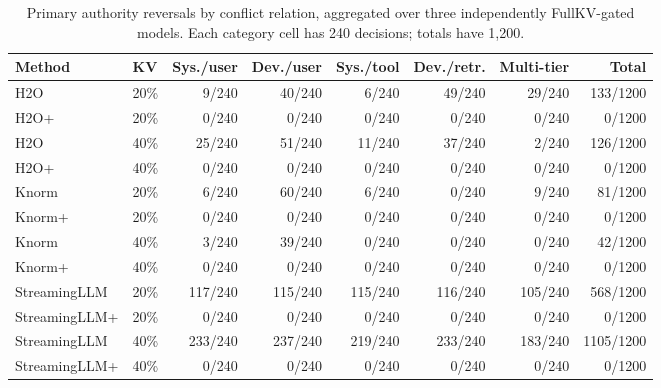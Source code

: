 \begin{table}[t]
\centering
\scriptsize
\setlength{\tabcolsep}{3.0pt}
\begin{tabular}{llrrrrrr}
\toprule
Method & KV & Sys./user & Dev./user & Sys./tool & Dev./retr. & Multi-tier & Total \\
\midrule
H2O & 20\% & 9/240 & 40/240 & 6/240 & 49/240 & 29/240 & 133/1200 \\
H2O+\method{} & 20\% & 0/240 & 0/240 & 0/240 & 0/240 & 0/240 & 0/1200 \\
H2O & 40\% & 25/240 & 51/240 & 11/240 & 37/240 & 2/240 & 126/1200 \\
H2O+\method{} & 40\% & 0/240 & 0/240 & 0/240 & 0/240 & 0/240 & 0/1200 \\
\midrule
Knorm & 20\% & 6/240 & 60/240 & 6/240 & 0/240 & 9/240 & 81/1200 \\
Knorm+\method{} & 20\% & 0/240 & 0/240 & 0/240 & 0/240 & 0/240 & 0/1200 \\
Knorm & 40\% & 3/240 & 39/240 & 0/240 & 0/240 & 0/240 & 42/1200 \\
Knorm+\method{} & 40\% & 0/240 & 0/240 & 0/240 & 0/240 & 0/240 & 0/1200 \\
\midrule
StreamingLLM & 20\% & 117/240 & 115/240 & 115/240 & 116/240 & 105/240 & 568/1200 \\
StreamingLLM+\method{} & 20\% & 0/240 & 0/240 & 0/240 & 0/240 & 0/240 & 0/1200 \\
StreamingLLM & 40\% & 233/240 & 237/240 & 219/240 & 233/240 & 183/240 & 1105/1200 \\
StreamingLLM+\method{} & 40\% & 0/240 & 0/240 & 0/240 & 0/240 & 0/240 & 0/1200 \\
\bottomrule
\end{tabular}
\caption{Primary authority reversals by conflict relation, aggregated over three independently FullKV-gated models. Each category cell has 240 decisions; totals have 1,200.}
\label{tab:category-full}
\end{table}
